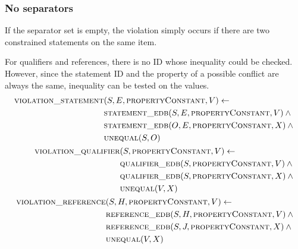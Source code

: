 \documentclass[hyperref,bachelorofscience,fleqn]{cgvpub}
\begin{document}
\subsubsection{No separators}\label{subsubsec_single_value_no_separators}
If the separator set is empty, the violation simply occurs if there are two constrained statements on the same item.

For qualifiers and references, there is no ID whose inequality could be checked. However, since the statement ID and the property of a possible conflict are always the same, inequality can be tested on the values.
\begin{align}
\begin{split}\label{eq_no_separators_triple}
\textsc{violation\_statement}&(S, E, \textsc{propertyConstant}, V) \leftarrow \\
&\textsc{statement\_edb}(S, E, \textsc{propertyConstant}, V) \wedge{} \\
&\textsc{statement\_edb}(O, E, \textsc{propertyConstant}, X) \wedge{} \\
&\textsc{unequal}(S, O)
\end{split}\\
\begin{split}
\textsc{violation\_qualifier}&(S, \textsc{propertyConstant}, V) \leftarrow \\
&\textsc{qualifier\_edb}(S, \textsc{propertyConstant}, V) \wedge{} \\
&\textsc{qualifier\_edb}(S, \textsc{propertyConstant}, X) \wedge{} \\
&\textsc{unequal}(V, X)
\end{split}\\
\begin{split}
\textsc{violation\_reference}&(S, H, \textsc{propertyConstant}, V) \leftarrow \\
&\textsc{reference\_edb}(S, H, \textsc{propertyConstant}, V) \wedge{} \\
&\textsc{reference\_edb}(S, J, \textsc{propertyConstant}, X) \wedge{} \\
&\textsc{unequal}(V, X)
\end{split}
\end{align}
\end{document}
